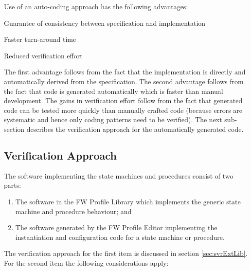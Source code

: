 \documentclass{pnp_article}
\begin{document}
Use of an auto-coding approach has the following advantages:

\begin{fw_itemize}
\item Guarantee of consistency between specification and implementation 
\item Faster turn-around time 
\item Reduced verification effort 
\end{fw_itemize}

The first advantage follows from the fact that the implementation is directly and automatically derived from the specification. The second advantage follows from the fact that code is generated automatically which is faster than manual development. The gains in verification effort follow from the fact that generated code can be tested more quickly than manually crafted code (because errors are systematic and hence only coding patterns need to be verified). The next sub-section describes the verification approach for the automatically generated code.

\subsection{Verification Approach}
The software implementing the state machines and procedures consist of two parts:

\begin{enumerate}
\item The software in the FW Profile Library which implements the generic state machine and procedure behaviour; and
\item The software generated by the FW Profile Editor implementing the instantiation and configuration code for a state machine or procedure.
\end{enumerate}

The verification approach for the first item is discussed in section \ref{sec:svrExtLib}. For the second item the following considerations apply:
\end{document}
